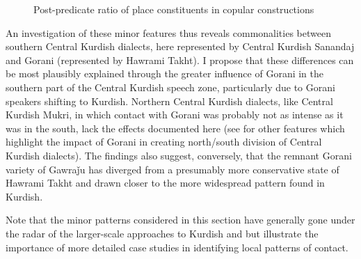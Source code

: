 \documentclass[output=paper,colorlinks,citecolor=brown]{langscibook}
\begin{document}
\begin{sloppypar}
\begin{figure}
    \caption{Post-predicate ratio of place constituents in copular constructions}
    \label{Kurdish:fig:4}
\end{figure}

An investigation of these minor  features thus reveals commonalities between southern Central Kurdish dialects, here represented by Central Kurdish Sanandaj and Gorani (represented by Hawrami Takht). I propose that these differences can be most plausibly explained through the greater influence of Gorani in the southern part of the Central Kurdish speech zone, particularly due to Gorani speakers shifting to Kurdish. Northern Central Kurdish dialects, like Central Kurdish Mukri, in which contact with Gorani was probably not as intense as it was in the south, lack the effects documented here (see \citealt[]{mohammadirad_gorani_inpress}{ for other features which highlight the impact of Gorani  in creating north/south division of Central Kurdish dialects}). The findings also suggest, conversely, that the remnant Gorani variety of Gawraǰu has diverged from a presumably more conservative state of Hawrami Takht and drawn closer to the more widespread pattern found in Kurdish. 

Note that the minor  patterns considered in this section have generally gone under the radar of the larger-scale approaches to Kurdish  and  but illustrate the importance of more detailed case studies in identifying local patterns of contact.


\end{sloppypar}
\end{document}
